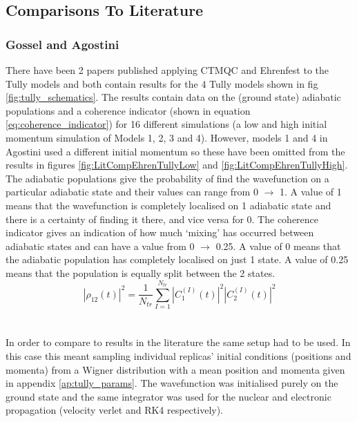 \subsection{Comparisons To Literature}
\subsubsection{Gossel and Agostini}
\label{sect:EhrenCompare}
There have been 2 papers published applying CTMQC and Ehrenfest to the Tully models \cite{gossel_coupled-trajectory_2018, agostini_quantum-classical_2016} and both contain results for the 4 Tully models shown in fig \ref{fig:tully_schematics}. The results contain data on the (ground state) adiabatic populations and a coherence indicator (shown in equation \eqref{eq:coherence_indicator}) for 16 different simulations (a low and high initial momentum simulation of Models 1, 2, 3 and 4). However, models 1 and 4 in Agostini \cite{agostini_quantum-classical_2016} used a different initial momentum so these have been omitted from the results in figures \ref{fig:LitCompEhrenTullyLow} and \ref{fig:LitCompEhrenTullyHigh}. The adiabatic populations give the probability of find the wavefunction on a particular adiabatic state and their values can range from 0 $\rightarrow$ 1. A value of 1 means that the wavefunction is completely localised on 1 adiabatic state and there is a certainty of finding it there, and vice versa for 0. The coherence indicator gives an indication of how much `mixing' has occurred between adiabatic states and can have a value from 0 $\rightarrow$ 0.25. A value of 0 means that the adiabatic population has completely localised on just 1 state. A value of 0.25 means that the population is equally split between the 2 states.
\begin{equation}
	|\rho_{12}(t)|^2 = \frac{1}{N_{tr}} \sum_{I=1}^{N_{tr}} |C_{1}^{(I)}(t)|^2 |C_{2}^{(I)}(t)|^2
	\label{eq:coherence_indicator}
\end{equation}
\\\\
In order to compare to results in the literature the same setup had to be used. In this case this meant sampling individual replicas' initial conditions (positions and momenta) from a Wigner distribution with a mean position and momenta given in appendix \ref{ap:tully_params}. The wavefunction was initialised purely on the ground state and the same integrator was used for the nuclear and electronic propagation (velocity verlet and RK4 respectively).
